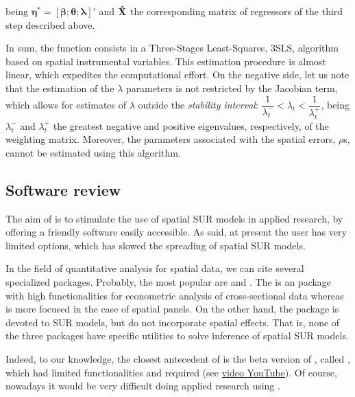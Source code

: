 \documentclass[article]{jss}
\begin{document}
being \({\boldsymbol \eta}^{*}=\left[{\boldsymbol \beta}; {\boldsymbol \theta}; {\boldsymbol \lambda}\right]'\) and \(\bf \hat{X}\) the corresponding matrix of regressors of the third step described above.

In sum, the  function consists in a Three-Stages Least-Squares, 3SLS, algorithm based on spatial instrumental variables. This estimation procedure is almost linear, which expedites the computational effort. On the negative side, let us note that the estimation of the \(\lambda\) parameters is not restricted by the Jacobian term, which allows for estimates of \(\lambda\) outside the \emph{stability interval}: \(\dfrac{1}{\lambda_{t}^{-}} < \lambda_{t} < \dfrac{1}{\lambda_{t}^{+}}\), being \({\lambda_{t}^{-}}\) and \({\lambda_{t}^{+}}\) the greatest negative and positive eigenvalues, respectively, of the weighting matrix. Moreover, the parameters associated with the spatial errors, \(\rho\)s, cannot be estimated using this algorithm.

\hypertarget{software-review}{%
\subsection{Software review}\label{software-review}}

The aim of  is to stimulate the use of spatial SUR models in applied research, by offering a friendly software easily accessible. As said, at present the user has very limited options, which has slowed the spreading of spatial SUR models.

In the field of quantitative analysis for spatial data, we can cite several  specialized packages. Probably, the most popular are  \citep{spdep} and  \citep{spml}. The  is an  package with high functionalities for econometric analysis of cross-sectional data whereas  is more focused in the case of spatial panels. On the other hand, the  package  \citep{systemfit} is devoted to SUR models, but do not incorporate spatial effects. That is, none of the three packages have specific utilities to solve inference of spatial SUR models.

Indeed, to our knowledge, the closest antecedent of  is the beta version of  \citep{AnselinSpaceStat}, called , which had limited functionalities and required  (see \href{https://www.youtube.com/watch?v=6pM0tDWqt3o\&t=53s}{video YouTube}). Of course, nowadays it would be very difficult doing applied research using .
\end{document}
